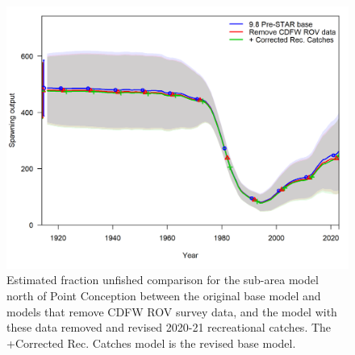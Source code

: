 \documentclass[
  letterpaper,
]{article}
\begin{document}
\pagebreak

\begin{figure}
\centering
\includegraphics[width=1\textwidth,height=1\textheight]{9.10_corrected_base_compare2_spawnbio_uncertainty.png}
\caption{Estimated fraction unfished comparison for the sub-area model north of Point Conception between the original base model and models that remove CDFW ROV survey data, and the model with these data removed and revised 2020-21 recreational catches. The +Corrected Rec. Catches model is the revised base model.\label{fig:north-depl}}
\end{figure}

\pagebreak
\end{document}
